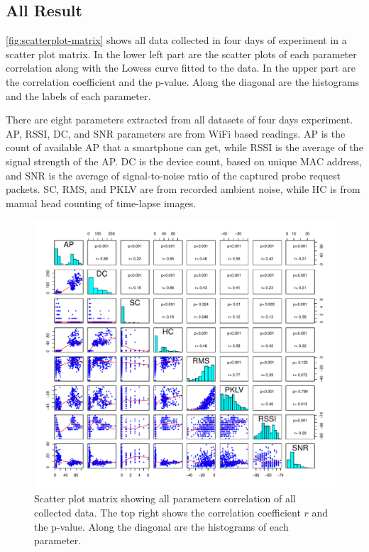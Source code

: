 	\subsection{All Result} %
	\label{sub:all_result}
	\autoref{fig:scatterplot-matrix} shows all data collected in four days of experiment in a scatter plot matrix. In the lower left part are the scatter plots of each parameter correlation along with the Lowess curve fitted to the data. In the upper part are the correlation coefficient and the p-value. Along the diagonal are the histograms and the labels of each parameter.

	There are eight parameters extracted from all datasets of four days experiment. \ac{AP}, \ac{RSSI}, \ac{DC}, and \ac{SNR} parameters are from WiFi based readings. \ac{AP} is the count of available \ac{AP} that a smartphone can get, while \ac{RSSI} is the average of the signal strength of the \ac{AP}. \ac{DC} is the device count, based on unique \ac{MAC} address, and \ac{SNR} is the average of signal-to-noise ratio of the captured probe request packets. \ac{SC}, \ac{RMS}, and \ac{PKLV} are from recorded ambient noise, while \ac{HC} is from manual head counting of time-lapse images.

	\begin{figure}[h]
		\begin{adjustwidth}{-3cm}{}
		\centering
		\includegraphics[width=1.3\textwidth]{./img/result/all-result}
		\end{adjustwidth}
		\caption[Scatter plot matrix of all parameters.]
		{Scatter plot matrix showing all parameters correlation of all collected data. The top right shows the correlation coefficient $r$ and the p-value. Along the diagonal are the histograms of each parameter.}
		\label{fig:scatterplot-matrix}
	\end{figure}

